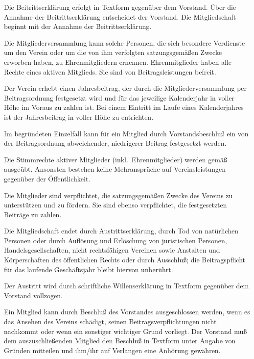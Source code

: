 \documentclass[draft]{scrartcl}
\begin{document}
\begin{contract}
Die Beitrittserklärung erfolgt in Textform gegenüber dem Vorstand. Über die
Annahme der Beitrittserklärung entscheidet der Vorstand. Die Mitgliedschaft
beginnt mit der Annahme der Beitrittserklärung.

Die Mitgliederversammlung kann solche Personen, die sich besondere Verdienste
um den Verein oder um die von ihm verfolgten satzungsgemäßen Zwecke erworben
haben, zu Ehrenmitgliedern ernennen. Ehrenmitglieder haben alle Rechte eines
aktiven Mitglieds. Sie sind von Beitragsleistungen befreit.


Der Verein erhebt einen Jahresbeitrag, der durch die Mitgliederversammlung
per Beitragsordnung festgesetzt wird und für das jeweilige Kalenderjahr in
voller Höhe im Voraus zu zahlen ist. Bei einem Eintritt im Laufe eines
Kalenderjahres ist der Jahresbeitrag in voller Höhe zu entrichten.

Im begründeten Einzelfall kann für ein Mitglied durch Vorstandsbeschluß ein
von der Beitragsordnung abweichender, niedrigerer Beitrag festgesetzt werden.


Die Stimmrechte aktiver Mitglieder (inkl.\ Ehrenmitglieder) werden gemäß
~ ausgeübt. Ansonsten bestehen
keine Mehransprüche auf Vereinsleistungen gegenüber der Öffentlichkeit.

Die Mitglieder sind verpflichtet, die satzungsgemäßen Zwecke des Vereins zu
unterstützen und zu fördern. Sie sind ebenso verpflichtet, die festgesetzten
Beiträge zu zahlen.


Die Mitgliedschaft endet durch Austrittserklärung, durch Tod von natürlichen
Personen oder durch Auf\/lösung und Erlöschung von juristischen Personen,
Handelsgesellschaften, nicht rechtsfähigen Vereinen sowie Anstalten und
Körperschaften des öffentlichen Rechts oder durch Ausschluß; die
Beitragspflicht für das laufende Geschäftsjahr bleibt hiervon unberührt.

Der Austritt wird durch schriftliche Willenserklärung in Textform
ge\-gen\-über dem Vorstand vollzogen.


Ein Mitglied kann durch Beschluß des Vorstandes ausgeschlossen werden, wenn es
das Ansehen des Vereins schädigt, seinen Beitragsverpflichtungen nicht
nachkommt oder wenn ein sonstiger wichtiger Grund vorliegt. Der Vorstand muß
dem auszuschließenden Mitglied den Beschluß in Textform unter Angabe von
Gründen mitteilen und ihm/ihr auf Verlangen eine Anhörung gewähren.


\end{contract}
\end{document}
